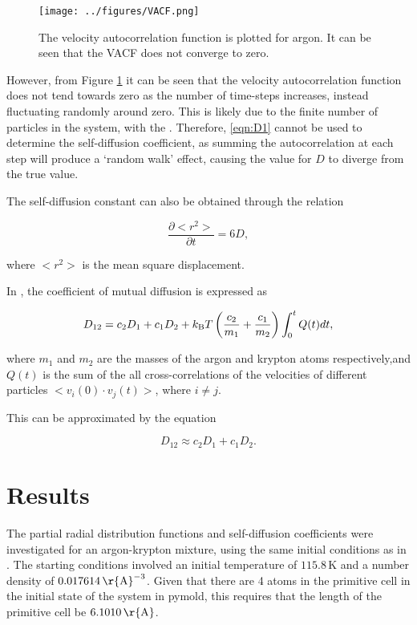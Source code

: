 \documentclass{article}
\begin{document}
\begin{figure}[h]
    \centering
    \texttt{[image: ../figures/VACF.png]}
    \caption{The velocity autocorrelation function is plotted for argon. It can be seen that the VACF does not converge to zero. \label{fig:VACFTest}}
\end{figure}

However, from Figure \ref{fig:VACFTest} it can be seen that the velocity autocorrelation function does not tend towards zero as the number of time-steps increases, instead fluctuating randomly around zero. This is likely due to the finite number of particles in the system, with the . Therefore, \ref{eqn:D1} cannot be used to determine the self-diffusion coefficient, as summing the autocorrelation at each step will produce a `random walk' effect, causing the value for $D$ to diverge from the true value.

The self-diffusion constant can also be obtained through the relation 

\begin{equation}
\frac{\partial <r^2>}{\partial t} = 6D,
\end{equation}

where $<r^2>$ is the mean square displacement.

In \cite{StructureAndDiffusion}, the coefficient of mutual diffusion is expressed as

\begin{equation}
D_{12} = c_2 D_1 + c_1 D_2 + k_{\rm{B}}T\left( \frac{c_2}{m_1} + \frac{c_1}{m_2} \right)\int_{0}^{t}Q(t)dt,
\end{equation}

where $m_1$ and $m_2$ are the masses of the argon and krypton atoms respectively,and $Q(t)$ is the sum of the all cross-correlations of the velocities of different particles $<v_i(0)\cdot v_j(t)>$, where $i\neq j$.

This can be approximated by the equation

\begin{equation}
D_{12} \approx c_2 D_1 + c_1 D_2.
\end{equation}

\section{Results}

The partial radial distribution functions and self-diffusion coefficients were investigated for an argon-krypton mixture, using the same initial conditions as in \cite{StructureAndDiffusion}. The starting conditions involved an initial temperature of $115.8\,$K and a number density of $0.017614\,\rm{\r{A}}^{-3}$.
Given that there are 4 atoms in the primitive cell in the initial state of the system in pymold, this requires that the length of the primitive cell be $6.1010\,\rm{\r{A}}$.
\end{document}
